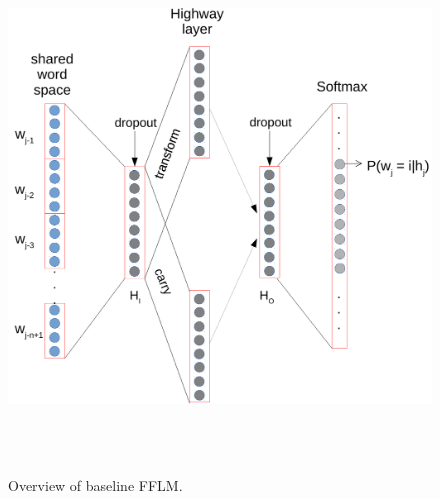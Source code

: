
~ \begin{figure}[!t]
~ \centering
~ \includegraphics[width=\columnwidth]{figures/baseline.pdf}
~ \caption{Overview of baseline FFLM.}  
~ \label{fig:baseline}
~ \end{figure}
%

